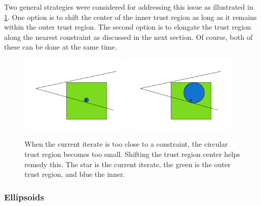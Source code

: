 Two general strategies were considered for addressing this issue as illustrated in \cref{options_basis}.
One option is to shift the center of the inner trust region as long as it remains within the outer trust region.
The second option is to elongate the trust region along the nearest constraint as discussed in the next section.
Of course, both of these can be done at the same time.


\begin{figure}[h]
    \centering
    \includegraphics[width=200px]{images/small_circle.png}
    \includegraphics[width=200px]{images/shifted_center.png}
    \caption{When the current iterate is too close to a constraint, the circular trust region becomes too small. Shifting the trust region center helps remedy this. The star is the current iterate, the green is the outer trust region, and blue the inner.}
    \label{options_basis}
\end{figure}

\subsubsection{Ellipsoids}

